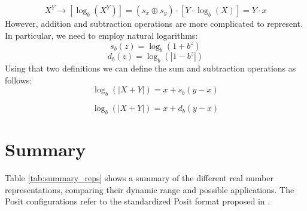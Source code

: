 \begin{equation}
    X^Y \xrightarrow[]{} \left[ \log_b(X ^ Y) \right] = (s_x \oplus s_y)\cdot \left[Y \cdot  \log_b(X)  \right] = Y\cdot x
\end{equation}
However, addition and subtraction operations are more complicated to represent. In particular, we need to employ natural logarithms:
\begin{equation}
    s_b(z) = \log_b (1 + b^z)
\end{equation}
\begin{equation}
    d_b(z) = \log_b (\left | 1 - b^z \right |)
\end{equation}
Using that two definitions we can define the sum and subtraction operations as follows:
\begin{equation}
    \log_b(|X + Y|) = x + s_b(y - x) 
\end{equation}

\begin{equation}
    \log_b(|X + Y|) = x + d_b(y - x) 
\end{equation}

\section{Summary}

Table \ref{tab:summary_reps} shows a summary of the different real number representations, comparing their dynamic range and possible applications. The Posit configurations refer to the standardized Posit format  proposed in \cite{posit_standard_2022}.

